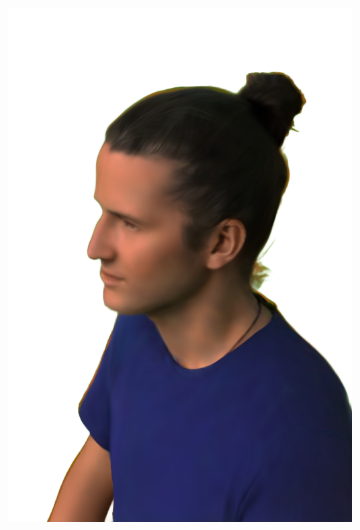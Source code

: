 \begin{figure}[ht]
\begin{subfigure}{0.2\linewidth}
		\includegraphics[width=\textwidth]{Figures/results/high/ephra_3d/23_render.png}
	\end{subfigure}
	\begin{subfigure}{0.2\linewidth}

\end{subfigure}
\end{figure}
